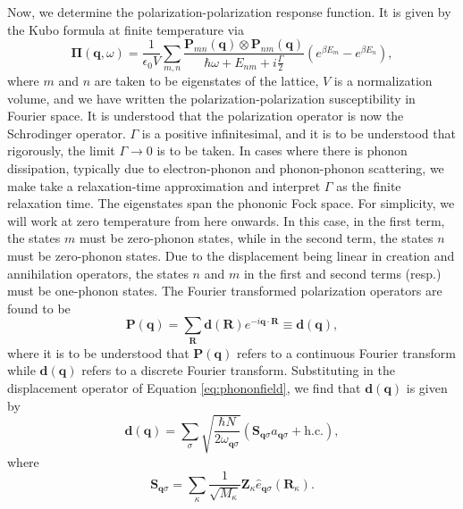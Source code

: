 \documentclass[aps,prb,twocolumn,
	groupedaddress,superscriptaddress,
	amsfonts,amssymb,amsmath,floatfix,
	citeautoscript]{revtex4-1}
\begin{document}
Now, we determine the polarization-polarization response function. It is given by the Kubo formula at finite temperature via
\begin{equation}\label{eq:polarizationkubo}
\boldsymbol{\Pi}(\mathbf{q},\omega) =  \frac{1}{\epsilon_0 V}\sum\limits_{m,n}\frac{\mathbf{P}_{mn}(\mathbf{q})\otimes\mathbf{P}_{nm}(\mathbf{q})}{\hbar\omega + E_{nm}+i\frac{\Gamma}{2}}\left(e^{\beta E_m}-e^{\beta E_n} \right),
\end{equation}
where $m$ and $n$ are taken to be eigenstates of the lattice, $V$ is a normalization volume, and we have written the polarization-polarization susceptibility in Fourier space. It is understood that the polarization operator is now the Schrodinger operator. $\Gamma$ is a positive infinitesimal, and it is to be understood that rigorously, the limit $\Gamma \rightarrow 0$ is to be taken. In cases where there is phonon dissipation, typically due to electron-phonon and phonon-phonon scattering, we make take a relaxation-time approximation and interpret $\Gamma$ as the finite relaxation time. The eigenstates span the phononic Fock space. For simplicity, we will work at zero temperature from here onwards. In this case, in the first term, the states $m$ must be zero-phonon states, while in the second term, the states $n$ must be zero-phonon states. Due to the displacement being linear in creation and annihilation operators, the states $n$ and $m$ in the first and second terms (resp.) must be one-phonon states. The Fourier transformed polarization operators are found to be
\begin{equation}\label{eq:fourierpolarization}
\mathbf{P}(\mathbf{q}) = \sum\limits_{\mathbf{R}}\mathbf{d}(\mathbf{R})e^{-i\mathbf{q}\cdot\mathbf{R}} \equiv \mathbf{d}(\mathbf{q}),
\end{equation}
where it is to be understood that $\mathbf{P}(\mathbf{q})$ refers to a continuous Fourier transform while $\mathbf{d}(\mathbf{q})$ refers to a discrete Fourier transform. Substituting in the displacement operator of Equation \ref{eq:phononfield}, we find that $\mathbf{d}(\mathbf{q})$ is given by
\begin{equation}\label{eq:phononstodipole}
\mathbf{d}(\mathbf{q}) = \sum\limits_{\sigma}\sqrt{\frac{\hbar N}{2\omega_{\mathbf{q}\sigma}}} \left(\mathbf{S}_{\mathbf{q}\sigma}a_{\mathbf{q}\sigma} + \text{h.c.}\right),
\end{equation}
where 
\begin{equation}\label{eq:oscillatordefinition}
\mathbf{S}_{\mathbf{q}\sigma} = \sum\limits_{\kappa} \frac{1}{\sqrt{M_{\kappa}}}\mathbf{Z}_{\kappa}\hat{e}_{\mathbf{q}\sigma}(\mathbf{R}_{\kappa}).
\end{equation}
\end{document}
